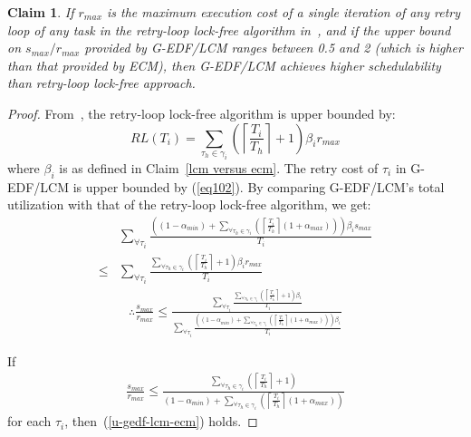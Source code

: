 \documentclass[conference]{IEEEtran}
\newtheorem{clm}{Claim}
\begin{document}
\begin{clm}
If $r_{max}$ is the maximum execution cost of a single iteration of any retry loop of any task in the retry-loop lock-free algorithm in~\cite{key-5}, and if the upper bound on $s_{max}/r_{max}$ provided by G-EDF/LCM ranges between 0.5 and 2 (which is higher than that provided by ECM), then G-EDF/LCM achieves higher schedulability than retry-loop lock-free approach.
\end{clm}
%
\begin{proof}
From~\cite{key-5}, the retry-loop lock-free algorithm is upper bounded by:
\begin{equation}
RL(T_i)=\sum_{\tau_{h}\in\gamma_{i}}\left(\left\lceil\frac{T_{i}}{T_{h}}\right\rceil +1\right)\beta_{i}r_{max}
\label{eq32}\end{equation}
where $\beta_i$ is as defined in Claim~\ref{lcm versus ecm}.
The retry cost of $\tau_i$ in G-EDF/LCM is upper bounded by (\ref{eq102}). By comparing G-EDF/LCM's total utilization with that of the retry-loop lock-free algorithm, we get:
\begin{eqnarray*}
& \sum_{\forall \tau_{i}}\frac{\left((1-\alpha_{min})+\sum_{\forall \tau_{h}\in\gamma_{i}}\left(\left\lceil\frac{T_{i}}{T_{h}}\right\rceil(1+\alpha_{max})\right)\right)\beta_{i}s_{max}}{T_{i}}\\
\le & \sum_{\forall \tau_{i}}\frac{\sum_{\forall \tau_{h}\in\gamma_{i}}\left(\left\lceil\frac{T_{i}}{T_{h}}\right\rceil+1\right)\beta_{i}r_{max}}{T_{i}}\end{eqnarray*}
%
\begin{eqnarray}
\therefore\frac{s_{max}}{r_{max}}\le \frac{\sum_{\forall \tau_{i}}\frac{\sum_{\forall \tau_{h}\in\gamma_{i}}\left(\left\lceil\frac{T_{i}}{T_{h}}\right\rceil+1\right)\beta_{i}}{T_{i}}}{\sum_{\forall \tau_{i}}\frac{\left((1-\alpha_{min})+\sum_{\forall \tau_{h}\in\gamma_{i}}\left(\left\lceil\frac{T_{i}}{T_{h}}\right\rceil(1+\alpha_{max})\right)\right)\beta_{i}}{T_{i}}}
\label{u-gedf-lcm-ecm}\end{eqnarray}

If
\begin{eqnarray}
\frac{s_{max}}{r_{max}}\le \frac{{\sum_{\forall \tau_{h}\in\gamma_{i}}\left(\left\lceil\frac{T_{i}}{T_{h}}\right\rceil+1\right)}}{{(1-\alpha_{min})+\sum_{\forall \tau_{h}\in\gamma_{i}}\left(\left\lceil\frac{T_{i}}{T_{h}}\right\rceil(1+\alpha_{max})\right)}}
\label{t-gedf-lcm-ecm}\end{eqnarray}
for each $\tau_i$, then~(\ref{u-gedf-lcm-ecm}) holds.


\end{proof}
\end{document}
